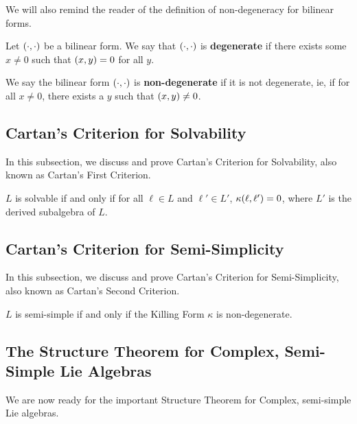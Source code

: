 We will also remind the reader of the definition of non-degeneracy for bilinear forms.

\begin{definition}
    Let $\left( \cdot, \cdot \right)$ be a bilinear form. We say that $\left( \cdot, \cdot \right)$ is \textbf{degenerate} if there exists some $x \neq 0$ such that $\left( x, y \right) = 0$ for all $y$.
\end{definition}
\begin{definition}
    We say the bilinear form $\left( \cdot, \cdot \right)$ is \textbf{non-degenerate} if it is not degenerate, ie, if for all $x \neq 0$, there exists a $y$ such that $\left( x, y \right) \neq 0$.
\end{definition}

\subsection{Cartan's Criterion for Solvability}

In this subsection, we discuss and prove Cartan's Criterion for Solvability, also known as Cartan's First Criterion.

\begin{boxtheorem}\label{SP:Thm:CartanI}
    $L$ is solvable if and only if for all $\ell \in L$ and $\ell' \in L'$, $\kappa\!\left( \ell, \ell' \right) = 0$, where $L'$ is the derived subalgebra of $L$.
\end{boxtheorem}

\subsection{Cartan's Criterion for Semi-Simplicity}

In this subsection, we discuss and prove Cartan's Criterion for Semi-Simplicity, also known as Cartan's Second Criterion.

\begin{boxtheorem}\label{SP:Thm:CartanII}
    $L$ is semi-simple if and only if the Killing Form $\kappa$ is non-degenerate.
\end{boxtheorem}

\subsection{The Structure Theorem for Complex, Semi-Simple Lie Algebras}

We are now ready for the important Structure Theorem for Complex, semi-simple Lie algebras.

